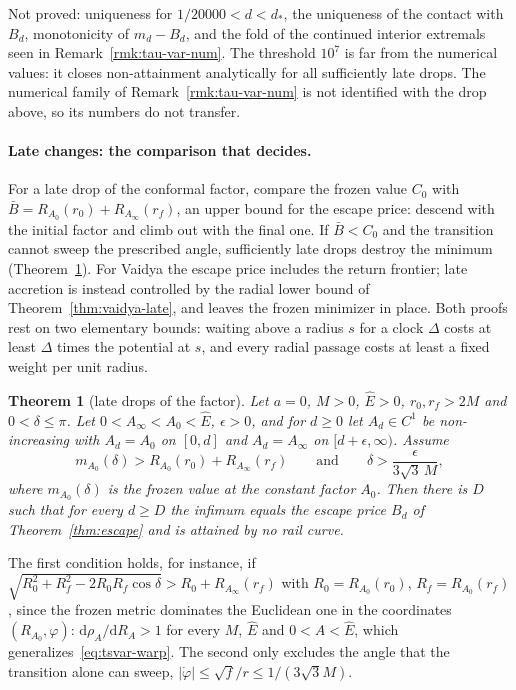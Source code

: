 \documentclass[aip,jmp,amsmath,amssymb,reprint]{revtex4-2}
\newcommand{\Ehat}{\hat E}
\newcommand{\dd}{\mathrm{d}}
\theoremstyle{plain}
\newtheorem{theorem}{Theorem}
\theoremstyle{definition}
\begin{document}
Not proved: uniqueness for $1/20000<d<d_*$, the uniqueness of the contact with $B_d$, monotonicity of
$m_d-B_d$, and the fold of the continued interior extremals seen in Remark~\ref{rmk:tau-var-num}.
The threshold $10^7$ is far from the numerical values: it closes non-attainment analytically for all
sufficiently late drops. The numerical family of Remark~\ref{rmk:tau-var-num} is not identified with the
drop above, so its numbers do not transfer.

\paragraph{Late changes: the comparison that decides.}
For a late drop of the conformal factor, compare the frozen value $C_0$ with
$\bar B=R_{A_0}(r_0)+R_{A_\infty}(r_f)$, an upper bound for the escape price: descend with the initial factor and
climb out with the final one. If $\bar B<C_0$ and the transition cannot sweep the prescribed angle,
sufficiently late drops destroy the minimum (Theorem~\ref{thm:tau-var-late}). For Vaidya the escape price
includes the return frontier; late accretion is instead controlled by the radial lower bound of
Theorem~\ref{thm:vaidya-late}, and leaves the frozen minimizer in place. Both proofs rest on two elementary bounds:
waiting above a radius $s$ for a clock $\Delta$ costs at least $\Delta$ times the potential at $s$, and every
radial passage costs at least a fixed weight per unit radius.

\begin{theorem}[late drops of the factor]\label{thm:tau-var-late}
Let $a=0$, $M>0$, $\Ehat>0$, $r_0,r_f>2M$ and $0<\delta\le\pi$. Let $0<A_\infty<A_0<\Ehat$, $\epsilon>0$, and for
$d\ge0$ let $A_d\in C^1$ be non-increasing with $A_d=A_0$ on $[0,d]$ and $A_d=A_\infty$ on $[d+\epsilon,\infty)$.
Assume
\begin{equation}
  m_{A_0}(\delta)>R_{A_0}(r_0)+R_{A_\infty}(r_f)
  \qquad\text{and}\qquad
  \delta>\frac{\epsilon}{3\sqrt3\,M},
  \label{eq:late-drop-hyp}
\end{equation}
where $m_{A_0}(\delta)$ is the frozen value at the constant factor $A_0$. Then there is $D$ such that for every
$d\ge D$ the infimum equals the escape price $B_d$ of Theorem~\ref{thm:escape} and is attained by no rail
curve.
\end{theorem}

The first condition holds, for instance, if
$\sqrt{R_0^2+R_f^2-2R_0R_f\cos\delta}>R_0+R_{A_\infty}(r_f)$ with $R_0=R_{A_0}(r_0)$, $R_f=R_{A_0}(r_f)$, since the
frozen metric dominates the Euclidean one in the coordinates $(R_{A_0},\varphi)$: $\dd\rho_A/\dd R_A>1$ for every
$M$, $\Ehat$ and $0<A<\Ehat$, which generalizes~\eqref{eq:tsvar-warp}.
The second only excludes the angle that the transition alone can sweep, $|\dot\varphi|\le\sqrt f/r\le1/(3\sqrt3M)$.
\end{document}
